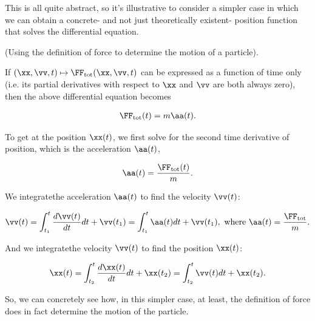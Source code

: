 \documentclass{article}
\begin{document}
This is all quite abstract, so it's illustrative to consider a simpler case in which we can obtain a concrete- and not just theoretically existent- position function that solves the differential equation.

\begin{deriv}
	(Using the definition of force to determine the motion of a particle).
	
	If $(\xx, \vv, t) \mapsto \FF_{\text{tot}}(\xx, \vv, t)$ can be expressed as a function of time only (i.e. its partial derivatives with respect to $\xx$ and $\vv$ are both always zero), then the above differential equation becomes
	
	\begin{align*}
		\FF_{\text{tot}}(t) = m \aa(t).
	\end{align*}
	
	To get at the position $\xx(t)$, we first solve for the second time derivative of position, which is the acceleration $\aa(t)$,
	
	\begin{align*}
		\aa(t) = \frac{\FF_{\text{tot}}(t)}{m}.
	\end{align*}
	
	We integrate\footnotemark the acceleration $\aa(t)$ to find the velocity $\vv(t)$:    
	
	\begin{align*}
		\vv(t) = \int_{t_1}^t \frac{d\vv(t)}{dt} dt + \vv(t_1) = \int_{t_1}^t \aa(t) dt + \vv(t_1), \text{ where $\aa(t) = \frac{\FF_{\text{tot}}}{m}$}.
	\end{align*}
	
	And we integrate\footnotemark the velocity $\vv(t)$ to find the position $\xx(t)$:
	
	\begin{align*}
		\xx(t) = \int_{t_2}^t \frac{d\xx(t)}{dt} dt + \xx(t_2) = \int_{t_2}^t \vv(t) dt + \xx(t_2).
	\end{align*}
	
	So, we can concretely see how, in this simpler case, at least, the definition of force does in fact determine the motion of the particle.
\end{deriv}

\addtocounter{footnote}{-2}
\end{document}
